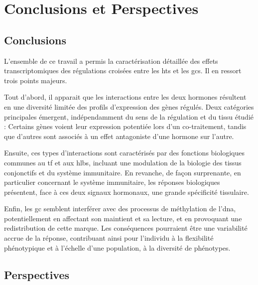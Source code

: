 \documentclass[../main.tex]{subfiles}
\begin{document}
\chapter{Conclusions et Perspectives}


\section{Conclusions}

	L'ensemble de ce travail a permis la caractérisation détaillée des effets transcriptomiques des régulations croisées entre les \glspl{ht} et les \glspl{gc}.
	Il en ressort trois points majeurs.
	\par
	Tout d'abord, il apparait que les interactions entre les deux hormones résultent en une diversité limitée des profils d'expression des gènes régulés.
	Deux catégories principales émergent, indépendamment du sens de la régulation et du tissu étudié :
	Certains gènes voient leur expression potentiée lors d'un co-traitement, tandis que d'autres sont associés à un effet antagoniste d'une hormone sur l'autre.
	\par
	Ensuite, ces types d'interactions sont caractérisés par des fonctions biologiques communes au \gls{tf} et aux \glspl{hlb}, incluant une modulation de la biologie des tissus conjonctifs et du système immunitaire.
	En revanche, de façon surprenante, en particulier concernant le système immunitaire, les réponses biologiques présentent, face à ces deux signaux hormonaux, une grande spécificité tissulaire.
	\par
	Enfin, les \gls{gc} semblent interférer avec des processus de méthylation de l'\gls{dna}, potentiellement en affectant son maintient et sa lecture, et en provoquant une redistribution de cette marque.
	Les conséquences pourraient être une variabilité accrue de la réponse, contribuant ainsi pour l'individu à la flexibilité phénotypique et à l'échelle d'une population, à la diversité de phénotypes.


\section{Perspectives}
\end{document}
